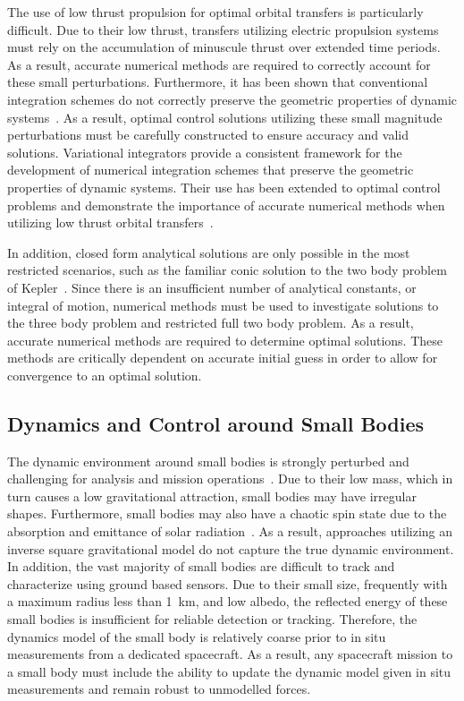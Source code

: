 The use of low thrust propulsion for optimal orbital transfers is particularly difficult.
Due to their low thrust, transfers utilizing electric propulsion systems must rely on the accumulation of minuscule thrust over extended time periods. 
As a result, accurate numerical methods are required to correctly account for these small perturbations.
Furthermore, it has been shown that conventional integration schemes do not correctly preserve the geometric properties of dynamic systems~\cite{leok2007,marsden2001}.
As a result, optimal control solutions utilizing these small magnitude perturbations must be carefully constructed to ensure accuracy and valid solutions.
Variational integrators provide a consistent framework for the development of numerical integration schemes that preserve the geometric properties of dynamic systems.
Their use has been extended to optimal control problems and demonstrate the importance of accurate numerical methods when utilizing low thrust orbital transfers~\cite{koon2004,leok2007,moore2011,gawlik2006,lee2007}.

In addition, closed form analytical solutions are only possible in the most restricted scenarios, such as the familiar conic solution to the two body problem of Kepler~\cite{bate1971}.
Since there is an insufficient number of analytical constants, or integral of motion, numerical methods must be used to investigate solutions to the three body problem and restricted full two body problem.
As a result, accurate numerical methods are required to determine optimal solutions.
These methods are critically dependent on accurate initial guess in order to allow for convergence to an optimal solution.

\subsection{Dynamics and Control around Small Bodies}

The dynamic environment around small bodies is strongly perturbed and challenging for analysis and mission operations~\cite{scheeres2012}.
Due to their low mass, which in turn causes a low gravitational attraction, small bodies may have irregular shapes.
Furthermore, small bodies may also have a chaotic spin state due to the absorption and emittance of solar radiation~\cite{rubincam2000}.
As a result, approaches utilizing an inverse square gravitational model do not capture the  true dynamic environment.
In addition, the vast majority of small bodies are difficult to track and characterize using ground based sensors.
Due to their small size, frequently with a maximum radius less than \SI{1}{\kilo\meter}, and low albedo, the reflected energy of these small bodies is insufficient for reliable detection or tracking.
Therefore, the dynamics model of the small body is relatively coarse prior to in situ measurements from a dedicated spacecraft.
As a result, any spacecraft mission to a small body must include the ability to update the dynamic model given in situ measurements and remain robust to unmodelled forces.

